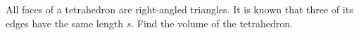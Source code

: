 All faces of a tetrahedron are right-angled triangles. It is known that three of its edges have the same length $s$. Find the volume of the tetrahedron.